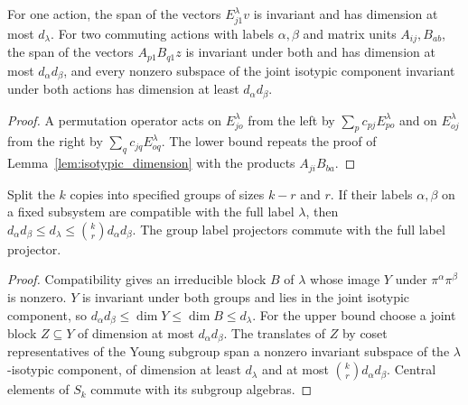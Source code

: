 \begin{lemma}
    \label{lem:joint_blocks}
    \leanok
    For one action, the span of the vectors $E^\lambda_{j1}v$ is invariant and
    has dimension at most $d_\lambda$. For two commuting actions with labels
    $\alpha,\beta$ and matrix units $A_{ij},B_{ab}$, the span of the vectors
    $A_{p1}B_{q1}z$ is invariant under both and has dimension at most
    $d_\alpha d_\beta$, and every nonzero subspace of the joint isotypic
    component invariant under both actions has dimension at least
    $d_\alpha d_\beta$.
\end{lemma}

\begin{proof}\leanok
    A permutation operator acts on $E^\lambda_{jo}$ from the left by
    $\sum_pc_{pj}E^\lambda_{po}$ and on $E^\lambda_{oj}$ from the right by
    $\sum_qc_{jq}E^\lambda_{oq}$. The lower bound repeats the proof of
    Lemma~\ref{lem:isotypic_dimension} with the products $A_{ji}B_{ba}$.
\end{proof}

\begin{theorem}
    \label{thm:schur_label_groups}
    \leanok
    Split the $k$ copies into specified groups of sizes $k-r$ and $r$. If
    their labels $\alpha,\beta$ on a fixed subsystem are compatible with the
    full label $\lambda$, then
    $d_\alpha d_\beta\le d_\lambda\le\binom{k}{r}d_\alpha d_\beta$. The group
    label projectors commute with the full label projector.
\end{theorem}

\begin{proof}\leanok
    Compatibility gives an irreducible block $B$ of $\lambda$ whose image $Y$
    under $\pi^\alpha\pi^\beta$ is nonzero. $Y$ is invariant under both groups
    and lies in the joint isotypic component, so
    $d_\alpha d_\beta\le\dim Y\le\dim B\le d_\lambda$. For the upper bound
    choose a joint block $Z\subseteq Y$ of dimension at most
    $d_\alpha d_\beta$. The translates of $Z$ by coset representatives of the
    Young subgroup span a nonzero invariant subspace of the $\lambda$-isotypic
    component, of dimension at least $d_\lambda$ and at most
    $\binom{k}{r}d_\alpha d_\beta$. Central elements of $S_k$ commute with
    its subgroup algebras.
\end{proof}

